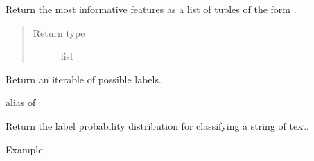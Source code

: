 \documentclass[letterpaper,10pt,english]{sphinxmanual}
\begin{document}
\begin{fulllineitems}
\begin{fulllineitems}
\end{fulllineitems}


\begin{fulllineitems}
\label{api_reference:textblob.classifiers.NaiveBayesClassifier.informative_features}
Return the most informative features as a list of tuples of the
form .
\begin{quote}\begin{description}
\item[{Return type}] \leavevmode
list

\end{description}\end{quote}

\end{fulllineitems}


\begin{fulllineitems}
\label{api_reference:textblob.classifiers.NaiveBayesClassifier.labels}
Return an iterable of possible labels.

\end{fulllineitems}


\begin{fulllineitems}
\label{api_reference:textblob.classifiers.NaiveBayesClassifier.nltk_class}
alias of {\hyperref[api_reference:textblob.classifiers.NaiveBayesClassifier]{}}

\end{fulllineitems}


\begin{fulllineitems}
\label{api_reference:textblob.classifiers.NaiveBayesClassifier.prob_classify}
Return the label probability distribution for classifying a string
of text.

Example:


\end{fulllineitems}
\end{fulllineitems}
\end{document}
